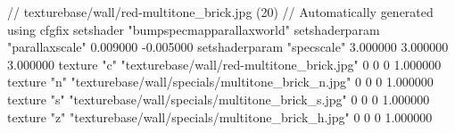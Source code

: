 // texturebase/wall/red-multitone_brick.jpg (20)
// Automatically generated using cfgfix
setshader "bumpspecmapparallaxworld"
setshaderparam "parallaxscale" 0.009000 -0.005000
setshaderparam "specscale" 3.000000 3.000000 3.000000
texture "c" "texturebase/wall/red-multitone_brick.jpg" 0 0 0 1.000000
texture "n" "texturebase/wall/specials/multitone_brick_n.jpg" 0 0 0 1.000000
texture "s" "texturebase/wall/specials/multitone_brick_s.jpg" 0 0 0 1.000000
texture "z" "texturebase/wall/specials/multitone_brick_h.jpg" 0 0 0 1.000000
